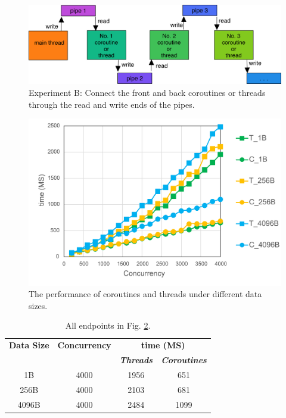 \documentclass[conference]{IEEEtran}
\begin{document}
\begin{figure}[htbp]
\centerline{\includegraphics[width=\columnwidth]{expb.png}}
\caption{Experiment B: Connect the front and back coroutines or threads through the read and write ends of the pipes.}
\label{test2}
\end{figure}

\begin{figure}[htbp]
\centerline{\includegraphics[width=\columnwidth]{tc.png}}
\caption{The performance of coroutines and threads under different data sizes.}
\label{tv}
\end{figure}

\begin{table}[htbp]
\caption{All endpoints in Fig. \ref{tv}.}
\begin{center}
\begin{tabular}{|c|c|c|c|}
\hline
\textbf{Data Size}& \textbf{Concurrency} & \multicolumn{2}{|c|}{\textbf{time (MS)}} \\
\cline{3-4} 
 &  & \textbf{\textit{Threads}}& \textbf{\textit{Coroutines}} \\
\hline
1B & 4000 & 1956 & 651 \\
  256B & 4000 & 2103 & 681 \\
  4096B & 4000 & 2484 & 1099 \\
\hline
\end{tabular}
\label{tab:Experiment B}
\end{center}
\end{table}
\end{document}
